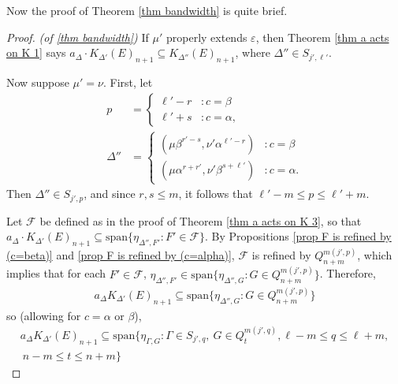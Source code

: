 \documentclass[12pt]{amsart}
\newcommand{\sse}{\subseteq}
\newcommand{\spn}{\text{span}}
\newcommand{\mc}[1]{\mathcal{#1}}
\newcommand{\al}{\alpha}
\newcommand{\be}{\beta}
\newcommand{\Ga}{\Gamma}
\newcommand{\De}{\Delta}
\newcommand{\ep}{\varepsilon}
\theoremstyle{plain} %
\theoremstyle{definition} %
\begin{document}
Now the proof of Theorem \ref{thm bandwidth} is quite brief.
\begin{proof}\label{proof of thm bandwidth} \textit{(of \ref{thm bandwidth})}
    If $\mu'$ properly extends $\ep$, then Theorem \ref{thm a acts on K 1} says $a_{\De} \cdot K_{\De'}(E)_{n+1} \sse K_{\De''}(E)_{n+1}$, where $\De'' \in S_{j',\ell'}$.

    Now suppose $\mu' = \nu$. First, let
    \begin{align*}
        p &= \begin{cases}
            \ell'-r &: c=\be\\
            \ell'+s &: c=\al,
        \end{cases}\\
        \De'' &= \begin{cases}
            (\mu \be^{r'-s}, \nu'\al^{\ell'-r}) &: c=\be\\
            (\mu\al^{r+r'}, \nu'\be^{s+\ell'}) &: c=\al.
        \end{cases}
    \end{align*}
    Then $\De'' \in S_{j',p}$, and since $r, s \le m$, it follows that $\ell' - m \le p \le \ell'+m$.
    
    Let $\mc{F}$ be defined as in the proof of Theorem \ref{thm a acts on K 3}, so that $a_{\De} \cdot K_{\De'}(E)_{n+1} \sse \spn\{ \eta_{\De'', F'} : F' \in \mc{F}\}$. By Propositions \ref{prop F is refined by (c=beta)} and \ref{prop F is refined by (c=alpha)}, $\mc{F}$ is refined by $Q_{n+m}^{m(j',p)}$, which implies that for each $F' \in \mc{F}$, $\eta_{\De'',F'} \in \spn\{ \eta_{\De'',G} : G \in Q_{n+m}^{m(j',p)} \}$. Therefore,
    \begin{align*}
        a_{\De} K_{\De'}(E)_{n+1} \sse \spn\{ \eta_{\De'',G} : G \in Q_{n+m}^{m(j',p)} \}
    \end{align*}
    so (allowing for $c = \al$ or $\be$),
    \begin{multline*}
        a_{\De} K_{\De'}(E)_{n+1} \sse \spn\{ \eta_{\Ga,G} : \Ga \in S_{j',q}, \ G \in Q_{t}^{m(j',q)}, \ell-m \le q \le \ell+m,\\ \ n-m \le t \le n+m \}
    \end{multline*}
    

\end{proof}
\end{document}
